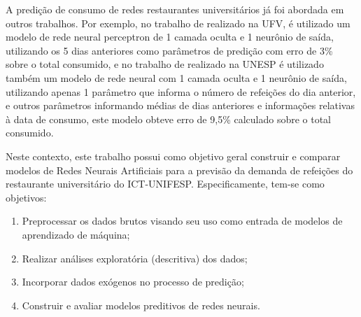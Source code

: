 


A predição de consumo de redes restaurantes universitários já foi abordada em outros trabalhos. Por exemplo, no trabalho de  \cite{Lopes2008} realizado na UFV, é utilizado um modelo de rede neural perceptron de 1 camada oculta e 1 neurônio de saída, utilizando os 5 dias anteriores como parâmetros de predição com erro de 3\% sobre o total consumido, e no trabalho de \cite{Rocha2011} realizado na UNESP é utilizado também um modelo de rede neural com 1 camada oculta e 1 neurônio de saída, utilizando apenas 1 parâmetro que informa o número de refeições do dia anterior, e outros parâmetros informando médias de dias anteriores e informações relativas à data de consumo, este modelo obteve erro de 9,5\% calculado sobre o total consumido.

Neste contexto, este trabalho possui como objetivo geral construir e comparar modelos de Redes Neurais Artificiais para a previsão da demanda de refeições do restaurante universitário do ICT-UNIFESP. Especificamente, tem-se como objetivos:  
\begin{enumerate}[label=\alph*)]
\item Preprocessar os dados brutos visando seu uso como entrada de modelos de aprendizado de máquina;
\item Realizar análises exploratória (descritiva) dos dados;
\item Incorporar dados exógenos no processo de predição;
\item Construir e avaliar modelos preditivos de redes neurais.
\end{enumerate}

